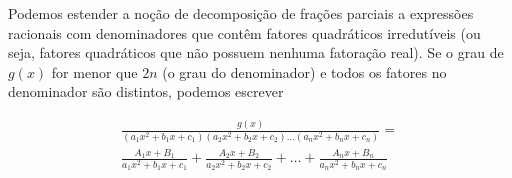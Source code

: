 \cleardoublepage\documentclass[../main.tex]{subfiles}
\begin{document}
Podemos estender a noção de decomposição de frações parciais a expressões racionais
com denominadores que contêm fatores quadráticos irredutíveis (ou seja, fatores quadráticos que não  possuem nenhuma fatoração real). Se o grau de $g (x)$ for menor que $2n$ (o grau do denominador) e todos os fatores no denominador são distintos, podemos escrever
\reversemarginpar
\begin{framed}
\begin{align}
    \frac{g(x)}{(a_1x^2+b_1x+c_1)(a_2x^2+b_2x+c_2)\ldots (a_nx^2+b_nx+c_n)}=\nonumber\\
    \frac{A_1x+B_1}{a_1x^2+b_1x+c_1}+\frac{A_2x+B_2}{a_2x^2+b_2x+c_2}+\ldots+\frac{A_nx+B_n}{a_nx^2+b_nx+c_n}\label{eq:FracParcFatQuad}%
    \end{align}\end{framed}
\end{document}

